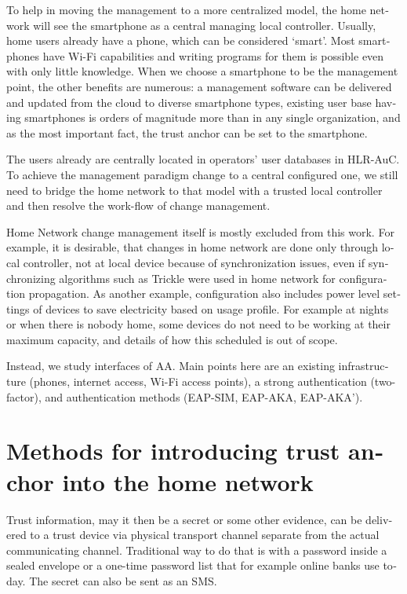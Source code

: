 \documentclass[12pt,a4paper,english]{tutthesis}
\begin{document}
\begin{otherlanguage}{english}
To help in moving the management to a more centralized
model, the home network will see the smartphone as a central managing local
controller.
Usually, home users already have a phone, which can be considered 
`smart'. Most smartphones have Wi-Fi capabilities and writing programs
for them is possible even with only little knowledge.
When we choose a smartphone to be the management point, the other benefits are
numerous:  a management software can be delivered and
updated from the cloud to diverse smartphone types, existing user
base having smartphones is orders of magnitude more than in any single
organization, and as the most important fact, the trust anchor can be set to the smartphone.

The users already are  centrally located  in operators' user databases
in HLR-AuC.  To achieve the management paradigm change to a central configured one,
we still need to bridge the home network to that model with a trusted local controller
and then resolve the work-flow of change management.


Home Network change management itself is mostly excluded from this work.
For example, 
it is desirable, that changes in home network are done only through
local controller, not at local device because of
synchronization issues, even 
if synchronizing algorithms such as Trickle\cite{rfc6206} were used in
home network for configuration propagation. As another example,
configuration also includes
power level settings of devices to save electricity based on usage
profile. For example at nights or when there is nobody home, some
devices do not need to be working at their maximum capacity, and
details of how this scheduled is out of scope.

Instead, we study interfaces of AA.  Main points here are an existing
infrastructure (phones, internet access, Wi-Fi access points),  a strong
authentication (two-factor), and authentication methods
(EAP-SIM, EAP-AKA, EAP-AKA').

\section{Methods for introducing trust anchor into the home network}
\label{sec-3-3}
\label{sec:altmethods}

 Trust information, may it then be a secret or some
other evidence, can be delivered to a trust device via physical
transport channel separate from the actual communicating channel.
Traditional way to do that is with a password inside a sealed
envelope or a one-time password list that for example online banks 
use today. The secret can also be sent as an SMS.


\end{otherlanguage}
\end{document}
